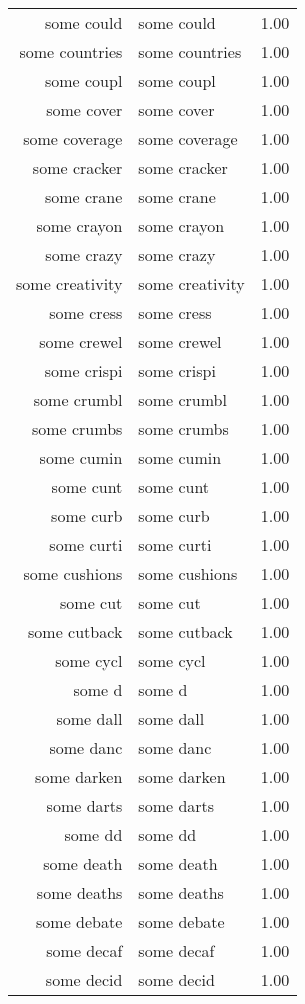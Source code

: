 \begin{table}[ht]
\begin{tabular}{rlr}
  some could & some could & 1.00 \\ 
  some countries & some countries & 1.00 \\ 
  some coupl & some coupl & 1.00 \\ 
  some cover & some cover & 1.00 \\ 
  some coverage & some coverage & 1.00 \\ 
  some cracker & some cracker & 1.00 \\ 
  some crane & some crane & 1.00 \\ 
  some crayon & some crayon & 1.00 \\ 
  some crazy & some crazy & 1.00 \\ 
  some creativity & some creativity & 1.00 \\ 
  some cress & some cress & 1.00 \\ 
  some crewel & some crewel & 1.00 \\ 
  some crispi & some crispi & 1.00 \\ 
  some crumbl & some crumbl & 1.00 \\ 
  some crumbs & some crumbs & 1.00 \\ 
  some cumin & some cumin & 1.00 \\ 
  some cunt & some cunt & 1.00 \\ 
  some curb & some curb & 1.00 \\ 
  some curti & some curti & 1.00 \\ 
  some cushions & some cushions & 1.00 \\ 
  some cut & some cut & 1.00 \\ 
  some cutback & some cutback & 1.00 \\ 
  some cycl & some cycl & 1.00 \\ 
  some d & some d & 1.00 \\ 
  some dall & some dall & 1.00 \\ 
  some danc & some danc & 1.00 \\ 
  some darken & some darken & 1.00 \\ 
  some darts & some darts & 1.00 \\ 
  some dd & some dd & 1.00 \\ 
  some death & some death & 1.00 \\ 
  some deaths & some deaths & 1.00 \\ 
  some debate & some debate & 1.00 \\ 
  some decaf & some decaf & 1.00 \\ 
  some decid & some decid & 1.00 \\ 

\end{tabular}
\end{table}
